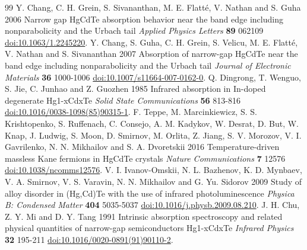 \documentclass[12pt]{article}
\begin{document}
\begin{thebibliography}{99}
 Y. Chang, C. H. Grein, S. Sivananthan, M. E. Flatté, V. Nathan and S. Guha 2006 Narrow gap HgCdTe absorption behavior near the band edge including nonparabolicity and the Urbach tail \textit{Applied Physics Letters} \textbf{89} 062109 \href{https://doi.org/10.1063/1.2245220}{doi:10.1063/1.2245220}.
 Y. Chang, S. Guha, C. H. Grein, S. Velicu, M. E. Flatté, V. Nathan and S. Sivananthan 2007 Absorption of narrow-gap HgCdTe near the band edge including nonparabolicity and the Urbach tail \textit{Journal of Electronic Materials} \textbf{36} 1000-1006 \href{https://doi.org/10.1007/s11664-007-0162-0}{doi:10.1007/s11664-007-0162-0}.
 Q. Dingrong, T. Wenguo, S. Jie, C. Junhao and Z. Guozhen 1985 Infrared absorption in In-doped degenerate Hg1-xCdxTe \textit{Solid State Communications} \textbf{56} 813-816 \href{https://doi.org/10.1016/0038-1098(85)90315-1}{doi:10.1016/0038-1098(85)90315-1}.
 F. Teppe, M. Marcinkiewicz, S. S. Krishtopenko, S. Ruffenach, C. Consejo, A. M. Kadykov, W. Desrat, D. But, W. Knap, J. Ludwig, S. Moon, D. Smirnov, M. Orlita, Z. Jiang, S. V. Morozov, V. I. Gavrilenko, N. N. Mikhailov and S. A. Dvoretskii 2016 Temperature-driven massless Kane fermions in HgCdTe crystals \textit{Nature Communications} \textbf{7} 12576 \href{https://doi.org/10.1038/ncomms12576}{doi:10.1038/ncomms12576}.
 V. I. Ivanov-Omskii, N. L. Bazhenov, K. D. Mynbaev, V. A. Smirnov, V. S. Varavin, N. N. Mikhailov and G. Yu. Sidorov 2009 Study of alloy disorder in (Hg,Cd)Te with the use of infrared photoluminescence \textit{Physica B: Condensed Matter} \textbf{404} 5035-5037 \href{https://doi.org/10.1016/j.physb.2009.08.210}{doi:10.1016/j.physb.2009.08.210}.
 J. H. Chu, Z. Y. Mi and D. Y. Tang 1991 Intrinsic absorption spectroscopy and related physical quantities of narrow-gap semiconductors Hg1-xCdxTe \textit{Infrared Physics} \textbf{32} 195-211 \href{https://doi.org/10.1016/0020-0891(91)90110-2}{doi:10.1016/0020-0891(91)90110-2}.
\end{thebibliography}
\end{document}
